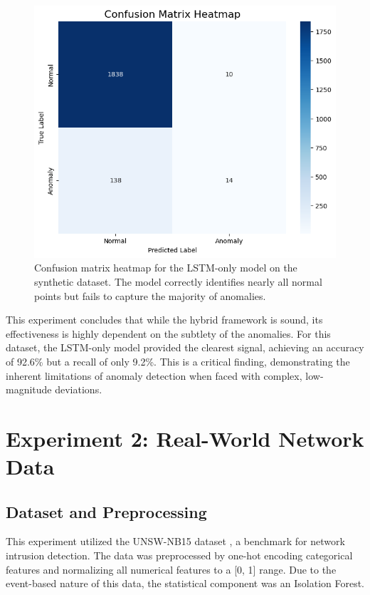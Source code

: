 \documentclass[conference]{IEEEtran}
\begin{document}
\begin{figure}[!t]
\centering
\includegraphics[width=0.8\columnwidth]{Confusion_matrix.png}
\caption{Confusion matrix heatmap for the LSTM-only model on the synthetic dataset. The model correctly identifies nearly all normal points but fails to capture the majority of anomalies.}
\label{fig:confusion_matrix}
\end{figure}

This experiment concludes that while the hybrid framework is sound, its effectiveness is highly dependent on the subtlety of the anomalies. For this dataset, the LSTM-only model provided the clearest signal, achieving an accuracy of 92.6\% but a recall of only 9.2\%. This is a critical finding, demonstrating the inherent limitations of anomaly detection when faced with complex, low-magnitude deviations.

\section{Experiment 2: Real-World Network Data}

\subsection{Dataset and Preprocessing}
This experiment utilized the UNSW-NB15 dataset \cite{b1}, a benchmark for network intrusion detection. The data was preprocessed by one-hot encoding categorical features and normalizing all numerical features to a [0, 1] range. Due to the event-based nature of this data, the statistical component was an Isolation Forest.
\end{document}
